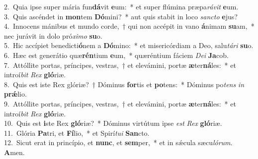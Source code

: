 {2.~}Quia ipse super mária fun\textbf{dá}vit \textbf{e}um:~* et super flúmina præpa\textit{rá}\textit{vit} \textbf{e}um.\\
{3.~}Quis ascéndet in \textbf{mon}tem \textbf{Dó}mini?~* aut quis stabit in loco \textit{san}\textit{cto} \textbf{e}jus?\\
{4.~}Innocens mánibus et mundo corde,~† qui non accépit in vano \textbf{á}nimam \textbf{su}am,~* nec jurávit in dolo pró\textit{xi}\textit{mo} \textbf{su}o.\\
{5.~}Hic accípiet benedicti\textbf{ó}nem a \textbf{Dó}mino:~* et misericórdiam a Deo, salu\textit{tá}\textit{ri} \textbf{su}o.\\
{6.~}Hæc est generátio quæ\textbf{rén}tium \textbf{e}um,~* quæréntium fáciem \textit{De}\textit{i} \textbf{Ja}cob.\\
{7.~}Attóllite portas, príncipes, vestras,~† et elevámini, portæ \textbf{æ}ter\textbf{ná}les:~* et introí\textit{bit} \textit{Rex} \textbf{gló}riæ.\\
{8.~}Quis est iste Rex glóriæ?~† Dóminus \textbf{for}tis et \textbf{po}tens:~* Dóminus po\textit{tens} \textit{in} \textbf{prǽ}lio.\\
{9.~}Attóllite portas, príncipes, vestras,~† et elevámini, portæ \textbf{æ}ter\textbf{ná}les:~* et introí\textit{bit} \textit{Rex} \textbf{gló}riæ.\\
{10.~}Quis est \textbf{i}ste Rex \textbf{gló}riæ?~* Dóminus virtútum ipse \textit{est} \textit{Rex} \textbf{gló}riæ.\\
{11.~}Glória \textbf{Pa}tri, et \textbf{Fí}lio,~* et Spirí\textit{tu}\textit{i} \textbf{San}cto.\\
{12.~}Sicut erat in princípio, et \textbf{nunc}, et \textbf{sem}per,~* et in sǽcula sæcu\textit{ló}\textit{rum}. \textbf{A}men.\\

